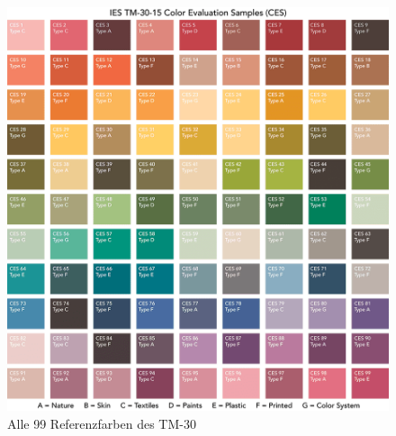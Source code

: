 \begin{figure}[H]     %
\centering
\includegraphics[width=1.0\textwidth]{bilder/tm301} 
\caption {Alle 99 Referenzfarben des TM-30\protect\footnotemark}\label{b_tm301}
\end{figure}


